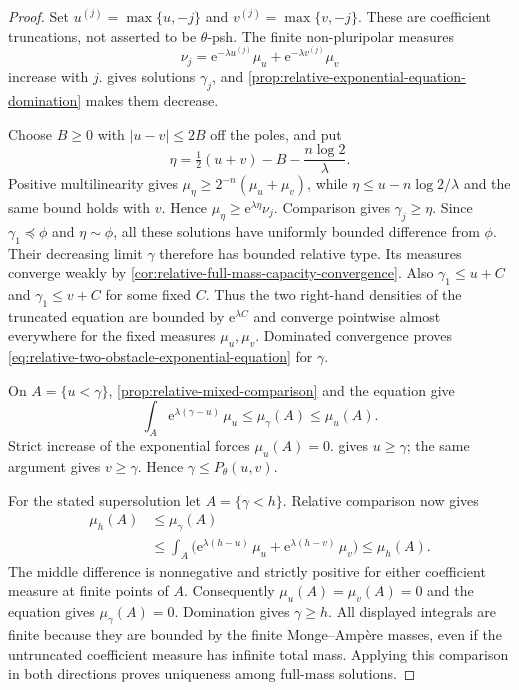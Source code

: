 \begin{proof}
Set $u^{(j)}=\max\{u,-j\}$ and $v^{(j)}=\max\{v,-j\}$. These are coefficient truncations, not asserted to be $\theta$-psh. The finite non-pluripolar measures
\[
 \nu_j=\mathrm e^{-\lambda u^{(j)}}\mu_u
                          +\mathrm e^{-\lambda v^{(j)}}\mu_v
\]
increase with $j$.  gives solutions $\gamma_j$, and \cref{prop:relative-exponential-equation-domination} makes them decrease.

Choose $B\geq0$ with $|u-v|\leq2B$ off the poles, and put
\[
 \eta=\tfrac12(u+v)-B-\frac{n\log2}{\lambda}.
\]
Positive multilinearity gives $\mu_\eta\geq2^{-n}(\mu_u+\mu_v)$, while $\eta\leq u-n\log2/\lambda$ and the same bound holds with $v$. Hence $\mu_\eta\geq\mathrm e^{\lambda\eta}\nu_j$. Comparison gives $\gamma_j\geq\eta$. Since $\gamma_1\preceq\phi$ and $\eta\sim\phi$, all these solutions have uniformly bounded difference from $\phi$. Their decreasing limit $\gamma$ therefore has bounded relative type. Its measures converge weakly by \cref{cor:relative-full-mass-capacity-convergence}. Also $\gamma_1\leq u+C$ and $\gamma_1\leq v+C$ for some fixed $C$. Thus the two right-hand densities of the truncated equation are bounded by $\mathrm e^{\lambda C}$ and converge pointwise almost everywhere for the fixed measures $\mu_u,\mu_v$. Dominated convergence proves \eqref{eq:relative-two-obstacle-exponential-equation} for $\gamma$.

On $A=\{u<\gamma\}$, \cref{prop:relative-mixed-comparison} and the equation give
\[
 \int_A\mathrm e^{\lambda(\gamma-u)}\,\mu_u
                 \leq\mu_\gamma(A)\leq\mu_u(A).
\]
Strict increase of the exponential forces $\mu_u(A)=0$.  gives $u\geq\gamma$; the same argument gives $v\geq\gamma$. Hence $\gamma\leq P_\theta(u,v)$.

For the stated supersolution let $A=\{\gamma<h\}$. Relative comparison now gives
\[
 \begin{aligned}
 \mu_h(A)&\leq\mu_\gamma(A)\\
  &\leq\int_A\bigl(\mathrm e^{\lambda(h-u)}\,\mu_u
                          +\mathrm e^{\lambda(h-v)}\,\mu_v\bigr)
   \leq\mu_h(A).
 \end{aligned}
\]
The middle difference is nonnegative and strictly positive for either coefficient measure at finite points of $A$. Consequently $\mu_u(A)=\mu_v(A)=0$ and the equation gives $\mu_\gamma(A)=0$. Domination gives $\gamma\geq h$. All displayed integrals are finite because they are bounded by the finite Monge--Amp\`ere masses, even if the untruncated coefficient measure has infinite total mass. Applying this comparison in both directions proves uniqueness among full-mass solutions.
\end{proof}

